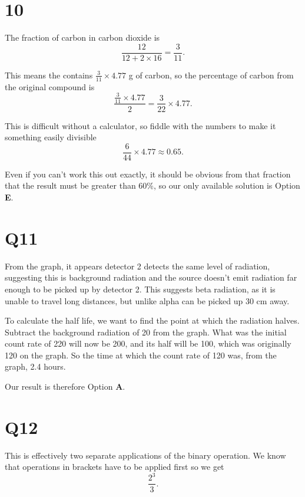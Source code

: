 \documentclass[11pt]{article}
\begin{document}
\section*{10}
The fraction of carbon in carbon dioxide is 
\begin{equation*}
\frac{12}{12+2\times 16} = \frac{3}{11}.
\end{equation*}
 
This means the  contains $\frac{3}{11} \times 4.77$ g of carbon, so the percentage of carbon from the original compound is
\begin{equation*}
\frac{\frac{3}{11}\times 4.77}{2} = \frac{3}{22}\times4.77.
\end{equation*}

This is difficult without a calculator, so fiddle with the numbers to make it something easily divisible
\begin{equation*}
\frac{6}{44}\times4.77 \approx 0.65.
\end{equation*}

Even if you can't work this out exactly, it should be obvious from that fraction that the result must be greater than 60\%, so our only available solution is Option \textbf{E}.

\section*{Q11}
From the graph, it appears detector 2 detects the same level of radiation, suggesting this is background radiation and the source doesn't emit radiation far enough to be picked up by detector 2.  This suggests beta radiation, as it is unable to travel long distances, but unlike alpha can be picked up 30 cm away.

To calculate the half life, we want to find the point at which the radiation halves.  Subtract the background radiation of 20 from the graph.  What was the initial count rate of 220 will now be 200, and its half will be 100, which was originally 120 on the graph.  So the time at which the count rate of 120 was, from the graph, 2.4 hours.

Our result is therefore Option \textbf{A}.

\section*{Q12}
This is effectively two separate applications of the binary operation.  We know that operations in brackets have to be applied first so we get
\begin{equation*}
\frac{2^3}{3}.
\end{equation*}
\end{document}
